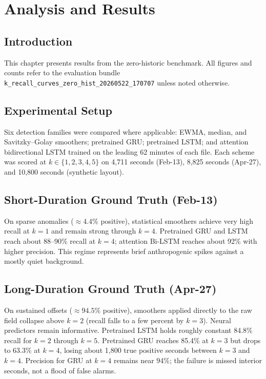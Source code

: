 \chapter{Analysis and Results}\doublespacing
\label{Chapter5}

\section{Introduction}
This chapter presents results from the zero-historic benchmark. All figures and counts refer to the evaluation bundle \texttt{k\_recall\_curves\_zero\_hist\_20260522\_170707} unless noted otherwise.

\section{Experimental Setup}
Six detection families were compared where applicable: EWMA, median, and Savitzky--Golay smoothers; pretrained GRU; pretrained LSTM; and attention bidirectional LSTM trained on the leading 62 minutes of each file. Each scheme was scored at $k \in \{1,2,3,4,5\}$ on 4,711 seconds (Feb-13), 8,825 seconds (Apr-27), and 10,800 seconds (synthetic layout).

\section{Short-Duration Ground Truth (Feb-13)}
On sparse anomalies ($\approx 4.4\%$ positive), statistical smoothers achieve very high recall at $k=1$ and remain strong through $k=4$. Pretrained GRU and LSTM reach about 88--90\% recall at $k=4$; attention Bi-LSTM reaches about 92\% with higher precision. This regime represents brief anthropogenic spikes against a mostly quiet background.

\section{Long-Duration Ground Truth (Apr-27)}
On sustained offsets ($\approx 94.5\%$ positive), smoothers applied directly to the raw field collapse above $k=2$ (recall falls to a few percent by $k=3$). Neural predictors remain informative. Pretrained LSTM holds roughly constant 84.8\% recall for $k=2$ through $k=5$. Pretrained GRU reaches 85.4\% at $k=3$ but drops to 63.3\% at $k=4$, losing about 1,800 true positive seconds between $k=3$ and $k=4$. Precision for GRU at $k=4$ remains near 94\%; the failure is missed interior seconds, not a flood of false alarms.

